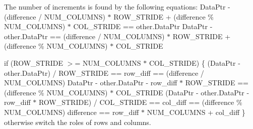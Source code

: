 The number of increments is found by the following equations\-: Data\-Ptr -\/ (difference / N\-U\-M\-\_\-\-C\-O\-L\-U\-M\-N\-S) $\ast$ R\-O\-W\-\_\-\-S\-T\-R\-I\-D\-E + (difference \% N\-U\-M\-\_\-\-C\-O\-L\-U\-M\-N\-S) $\ast$ C\-O\-L\-\_\-\-S\-T\-R\-I\-D\-E == other.\-Data\-Ptr Data\-Ptr -\/ other.\-Data\-Ptr == (difference / N\-U\-M\-\_\-\-C\-O\-L\-U\-M\-N\-S) $\ast$ R\-O\-W\-\_\-\-S\-T\-R\-I\-D\-E + (difference \% N\-U\-M\-\_\-\-C\-O\-L\-U\-M\-N\-S) $\ast$ C\-O\-L\-\_\-\-S\-T\-R\-I\-D\-E

if (R\-O\-W\-\_\-\-S\-T\-R\-I\-D\-E $>$= N\-U\-M\-\_\-\-C\-O\-L\-U\-M\-N\-S $\ast$ C\-O\-L\-\_\-\-S\-T\-R\-I\-D\-E) \{ (Data\-Ptr -\/ other.\-Data\-Ptr) / R\-O\-W\-\_\-\-S\-T\-R\-I\-D\-E == row\-\_\-diff == (difference / N\-U\-M\-\_\-\-C\-O\-L\-U\-M\-N\-S) Data\-Ptr -\/ other.\-Data\-Ptr -\/ row\-\_\-diff $\ast$ R\-O\-W\-\_\-\-S\-T\-R\-I\-D\-E == (difference \% N\-U\-M\-\_\-\-C\-O\-L\-U\-M\-N\-S) $\ast$ C\-O\-L\-\_\-\-S\-T\-R\-I\-D\-E (Data\-Ptr -\/ other.\-Data\-Ptr -\/ row\-\_\-diff $\ast$ R\-O\-W\-\_\-\-S\-T\-R\-I\-D\-E) / C\-O\-L\-\_\-\-S\-T\-R\-I\-D\-E == col\-\_\-diff == (difference \% N\-U\-M\-\_\-\-C\-O\-L\-U\-M\-N\-S) difference == row\-\_\-diff $\ast$ N\-U\-M\-\_\-\-C\-O\-L\-U\-M\-N\-S + col\-\_\-diff \} otherwise switch the roles of rows and columns.

